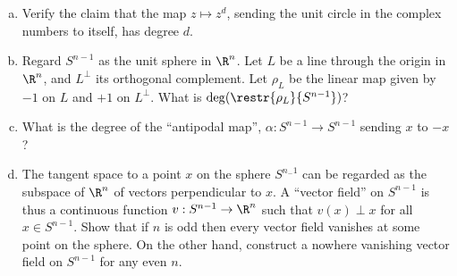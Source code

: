 \documentclass[11pt,letterpaper]{article}
\begin{document}
\begin{problem}\noindent
    \begin{enumerate}[(a)]
        \item Verify the claim that the map $z\mapsto z^d$, sending the unit circle in the complex numbers to itself, has degree $d$.
        \item Regard $S^{n-1}$ as the unit sphere in $\R^n$. Let $L$ be a line through the origin in $\R^n$, and $L^\perp$ its orthogonal complement. Let $\rho_L$ be the linear map given by $-1$ on $L$ and $+1$ on $L^\perp$. What is $\deg(\restr{\rho_L}{S^{n-1}})$?
        \item What is the degree of the ``antipodal map'', $\alpha : S^{n-1}\to S^{n-1}$ sending $x$ to $-x$?
        \item The tangent space to a point $x$ on the sphere $S^{n_-1}$ can be regarded as the subspace of $\R^n$ of vectors perpendicular to $x$. A ``vector field'' on $S^{n-1}$ is thus a continuous function $v : S^{n-1}\to \R^n$ such that $v(x)\perp x$ for all $x\in S^{n-1}$. Show that if $n$ is odd then every vector field vanishes at some point on the sphere. On the other hand, construct a nowhere vanishing vector field on $S^{n-1}$ for any even $n$.
    \end{enumerate}
\end{problem}
\end{document}
